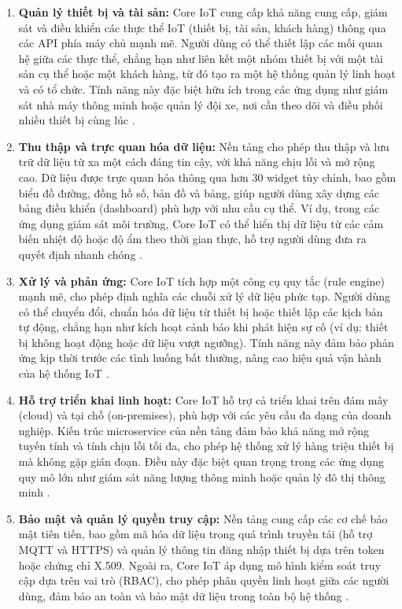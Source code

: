 \begin{enumerate}
    \item \textbf{Quản lý thiết bị và tài sản:} Core IoT cung cấp khả năng cung cấp, giám sát và điều khiển các thực thể IoT (thiết bị, tài sản, khách hàng) thông qua các API phía máy chủ mạnh mẽ. Người dùng có thể thiết lập các mối quan hệ giữa các thực thể, chẳng hạn như liên kết một nhóm thiết bị với một tài sản cụ thể hoặc một khách hàng, từ đó tạo ra một hệ thống quản lý linh hoạt và có tổ chức. Tính năng này đặc biệt hữu ích trong các ứng dụng như giám sát nhà máy thông minh hoặc quản lý đội xe, nơi cần theo dõi và điều phối nhiều thiết bị cùng lúc \cite{CoreIoT}.

    \item \textbf{Thu thập và trực quan hóa dữ liệu:} Nền tảng cho phép thu thập và lưu trữ dữ liệu từ xa một cách đáng tin cậy, với khả năng chịu lỗi và mở rộng cao. Dữ liệu được trực quan hóa thông qua hơn 30 widget tùy chỉnh, bao gồm biểu đồ đường, đồng hồ số, bản đồ và bảng, giúp người dùng xây dựng các bảng điều khiển (dashboard) phù hợp với nhu cầu cụ thể. Ví dụ, trong các ứng dụng giám sát môi trường, Core IoT có thể hiển thị dữ liệu từ các cảm biến nhiệt độ hoặc độ ẩm theo thời gian thực, hỗ trợ người dùng đưa ra quyết định nhanh chóng \cite{ThingsBoardDocs}.

    \item \textbf{Xử lý và phản ứng:} Core IoT tích hợp một công cụ quy tắc (rule engine) mạnh mẽ, cho phép định nghĩa các chuỗi xử lý dữ liệu phức tạp. Người dùng có thể chuyển đổi, chuẩn hóa dữ liệu từ thiết bị hoặc thiết lập các kịch bản tự động, chẳng hạn như kích hoạt cảnh báo khi phát hiện sự cố (ví dụ: thiết bị không hoạt động hoặc dữ liệu vượt ngưỡng). Tính năng này đảm bảo phản ứng kịp thời trước các tình huống bất thường, nâng cao hiệu quả vận hành của hệ thống IoT \cite{CoreIoT}.

    \item \textbf{Hỗ trợ triển khai linh hoạt:} Core IoT hỗ trợ cả triển khai trên đám mây (cloud) và tại chỗ (on-premises), phù hợp với các yêu cầu đa dạng của doanh nghiệp. Kiến trúc microservice của nền tảng đảm bảo khả năng mở rộng tuyến tính và tính chịu lỗi tối đa, cho phép hệ thống xử lý hàng triệu thiết bị mà không gặp gián đoạn. Điều này đặc biệt quan trọng trong các ứng dụng quy mô lớn như giám sát năng lượng thông minh hoặc quản lý đô thị thông minh \cite{ThingsBoardDocs}.

    \item \textbf{Bảo mật và quản lý quyền truy cập:} Nền tảng cung cấp các cơ chế bảo mật tiên tiến, bao gồm mã hóa dữ liệu trong quá trình truyền tải (hỗ trợ MQTT và HTTPS) và quản lý thông tin đăng nhập thiết bị dựa trên token hoặc chứng chỉ X.509. Ngoài ra, Core IoT áp dụng mô hình kiểm soát truy cập dựa trên vai trò (RBAC), cho phép phân quyền linh hoạt giữa các người dùng, đảm bảo an toàn và bảo mật dữ liệu trong toàn bộ hệ thống \cite{MQTT}.
\end{enumerate}

